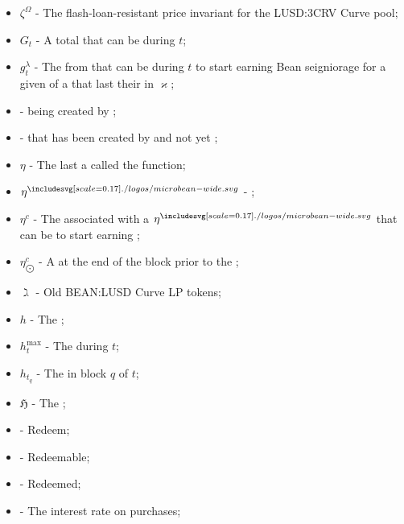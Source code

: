 \documentclass[class=article, crop=false]{standalone}
\begin{document}
\begin{itemize}[topsep=0pt, itemsep=3pt,leftmargin=16pt]
    \item[] $\zeta^{\Omega}$ - \hypertarget{ht99}{The flash-loan-resistant price invariant for the LUSD:3CRV Curve pool};
    \item[] $G_t$ - \hypertarget{ht100}{A  total  that can be  during $t$};
    \item[] $g_{t}^{\lambda}$ - \hypertarget{ht101}{The  from  that can be  during $t$ to start earning Bean seigniorage for a given  of a  that last  their  in $\varkappa$};
    \item[]  - \hypertarget{ht102}{ being created by };
    \item[]  - \hypertarget{ht103}{ that has been created by  and not yet };
    \item[] $\eta$ - \hypertarget{ht104}{The last  a  called the  function};
    \item[] $\eta^{\bean}$ - \hypertarget{ht105}{ \Bean};
    \item[] $\eta^{c}$ - \hypertarget{ht106}{The   associated with a  $\eta^{\bean}$ that can be  to start earning };
    \item[] $\eta_{\bigodot}^c$ - \hypertarget{ht107}{A    at the end of the block prior to the };
    \item[] $\gimel$ - \hypertarget{ht108}{Old BEAN:LUSD Curve LP tokens};
    \item[] $h$ - \hypertarget{ht110}{The };
    \item[] $h_t^{\text{max}}$ - The  during $t$;
    \item[] $h_{t_q}$ - The  in block $q$ of $t$;
    \item[] $\mathfrak{H}$ - \hypertarget{ht111}{The };
    \item[]  - \hypertarget{ht112}{Redeem};
    \item[]  - \hypertarget{ht113}{Redeemable};
    \item[]  - \hypertarget{ht114}{Redeemed};
    \item[]  - \hypertarget{ht115}{The interest rate on  purchases};

\end{itemize}
\end{document}
